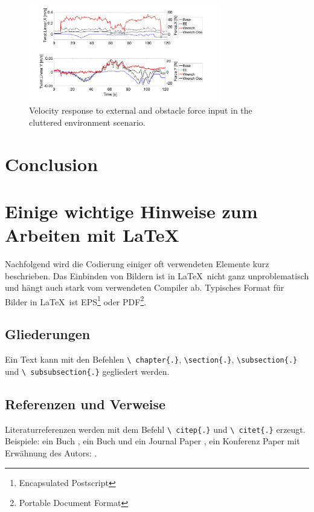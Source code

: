 \begin{figure}
   \centering
   \includegraphics[width=0.75\textwidth]{images/test15_response.jpg}
   \caption{Velocity response to external and obstacle force input in the cluttered environment scenario.}
   \label{pics:test15}
\end{figure}

\chapter{Conclusion}

\chapter{Einige wichtige Hinweise zum Arbeiten mit \LaTeX\ }
\label{sec:latexumg}

Nachfolgend wird die Codierung einiger oft verwendeten Elemente
kurz beschrieben. Das Einbinden von Bildern ist in \LaTeX\ nicht
ganz unproblematisch und hängt auch stark vom verwendeten Compiler
ab. Typisches Format für Bilder in \LaTeX\ ist
EPS\footnote{Encapsulated Postscript} oder PDF\footnote{Portable Document Format}.


\section{Gliederungen}
\label{sec:gliederung}

Ein Text kann mit den Befehlen \texttt{\textbackslash
chapter\{.\}}, \texttt{\textbackslash section\{.\}},
\texttt{\textbackslash subsection\{.\}} und \texttt{\textbackslash
subsubsection\{.\}} gegliedert werden.


\section{Referenzen und Verweise}
\label{sec:refverw}

Literaturreferenzen werden mit dem Befehl \texttt{\textbackslash
citep\{.\}} und \texttt{\textbackslash
citet\{.\}} erzeugt. Beispiele: ein Buch \citep{Raibert1986LeggedRobotsThatBalance}, ein Buch und ein Journal Paper \citep{Raibert1986LeggedRobotsThatBalance,Vukobratovic2004ZeroMomentPoint}, ein Konferenz Paper mit Erwähnung des Autors: \citet{Pratt1995SEA}.

